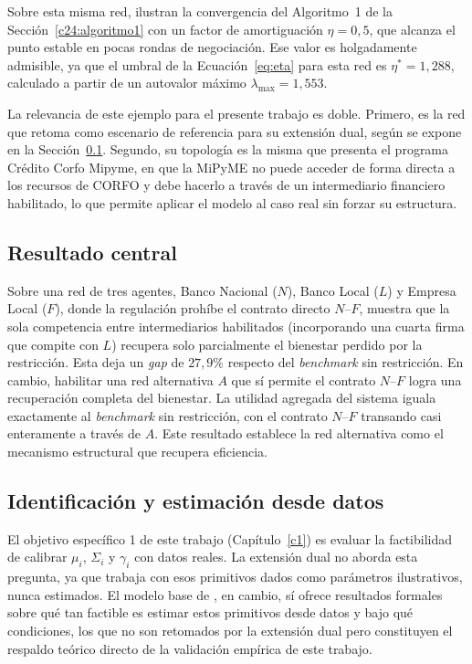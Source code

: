 Sobre esta misma red,  ilustran la convergencia del Algoritmo~1 de la Sección~\ref{c24:algoritmo1} con un factor de amortiguación $\eta=0{,}5$, que alcanza el punto estable en pocas rondas de negociación. Ese valor es holgadamente admisible, ya que el umbral de la Ecuación~\eqref{eq:eta} para esta red es $\eta^*=1{,}288$, calculado a partir de un autovalor máximo $\lambda_{\max}=1{,}553$.

La relevancia de este ejemplo para el presente trabajo es doble. Primero, es la red que  retoma como escenario de referencia para su extensión dual, según se expone en la Sección~\ref{c24:resultado}. Segundo, su topología es la misma que presenta el programa Crédito Corfo Mipyme, en que la MiPyME no puede acceder de forma directa a los recursos de CORFO y debe hacerlo a través de un intermediario financiero habilitado, lo que permite aplicar el modelo al caso real sin forzar su estructura.

\subsection{Resultado central}
\label{c24:resultado}

Sobre una red de tres agentes, Banco Nacional ($N$), Banco Local ($L$) y Empresa Local ($F$), donde la regulación prohíbe el contrato directo $N$--$F$,  muestra que la sola competencia entre intermediarios habilitados (incorporando una cuarta firma que compite con $L$) recupera solo parcialmente el bienestar perdido por la restricción. Esta deja un \textit{gap} de $27{,}9\%$ respecto del \textit{benchmark} sin restricción. En cambio, habilitar una red alternativa $A$ que sí permite el contrato $N$--$F$ logra una recuperación completa del bienestar. La utilidad agregada del sistema iguala exactamente al \textit{benchmark} sin restricción, con el contrato $N$--$F$ transando casi enteramente a través de $A$. Este resultado establece la red alternativa como el mecanismo estructural que recupera eficiencia.

\subsection{Identificación y estimación desde datos}
\label{c24:identificacion}

El objetivo específico 1 de este trabajo (Capítulo~\ref{c1}) es evaluar la factibilidad de calibrar $\mu_i$, $\Sigma_i$ y $\gamma_i$ con datos reales. La extensión dual no aborda esta pregunta, ya que trabaja con esos primitivos dados como parámetros ilustrativos, nunca estimados. El modelo base de , en cambio, sí ofrece resultados formales sobre qué tan factible es estimar estos primitivos desde datos y bajo qué condiciones, los que no son retomados por la extensión dual pero constituyen el respaldo teórico directo de la validación empírica de este trabajo.

